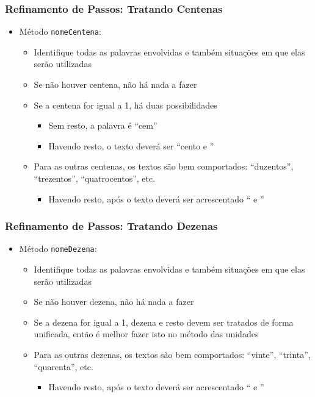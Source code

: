 \documentclass[xcolor={dvipsnames,table},aspectratio=169]{beamer}
\begin{document}
\begin{frame}\frametitle{Refinamento de Passos: Tratando Centenas}
\begin{itemize}
	\item Método \texttt{nomeCentena}:
	\begin{itemize}
		\item Identifique todas as palavras envolvidas e também situações em que elas serão utilizadas
		\item Se não houver centena, não há nada a fazer
		\item Se a centena for igual a 1, há duas possibilidades
		\begin{itemize}
			\item Sem resto, a palavra é ``cem''
			\item Havendo resto, o texto deverá ser ``cento e ''
		\end{itemize}
		\item Para as outras centenas, os textos são bem comportados: ``duzentos'', ``trezentos'', ``quatrocentos'', etc.
		\begin{itemize}
			\item Havendo resto, após o texto deverá ser acrescentado `` e ''
		\end{itemize}
	\end{itemize}
\end{itemize}
\end{frame}

\begin{frame}\frametitle{Refinamento de Passos: Tratando Dezenas}
\begin{itemize}
	\item Método \texttt{nomeDezena}:
	\begin{itemize}
		\item Identifique todas as palavras envolvidas e também situações em que elas serão utilizadas
		\item Se não houver dezena, não há nada a fazer
		\item Se a dezena for igual a 1, dezena e resto devem ser tratados de forma unificada, então é melhor fazer isto no método das unidades
		\item Para as outras dezenas, os textos são bem comportados: ``vinte'', ``trinta'', ``quarenta'', etc.
		\begin{itemize}
			\item Havendo resto, após o texto deverá ser acrescentado `` e ''
		\end{itemize}
	\end{itemize}
\end{itemize}
\end{frame}
\end{document}

